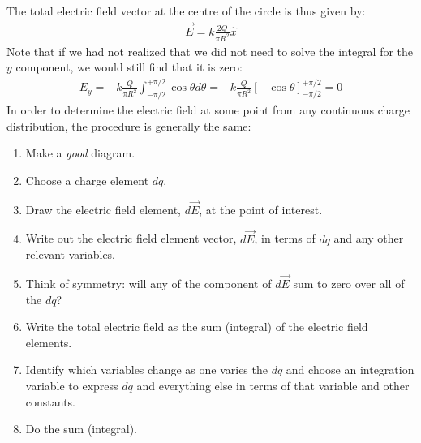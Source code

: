 The total electric field vector at the centre of the circle is thus given by:
\begin{align*}
\vec E = k\frac{2Q}{\pi R^2} \hat x
\end{align*}
Note that if we had not realized that we did not need to solve the integral for the $y$ component, we would still find that it is zero:
\begin{align*}
E_y= -k\frac{Q}{\pi R^2}\int_{-\pi/2}^{+\pi/2}\cos\theta d\theta=-k\frac{Q}{\pi R^2}\left[ -\cos\theta \right]_{-\pi/2}^{+\pi/2}=0
\end{align*}
In order to determine the electric field at some point from any continuous charge distribution, the procedure is generally the same:
\begin{enumerate}
\item Make a \textit{good} diagram.
\item Choose a charge element $dq$.
\item Draw the electric field element, $d\vec E$, at the point of interest.
\item Write out the electric field element vector, $d\vec E$, in terms of $dq$ and any other relevant variables.
\item Think of symmetry: will any of the component of $d\vec E$ sum to zero over all of the $dq$?
\item Write the total electric field as the sum (integral) of the electric field elements.
\item Identify which variables change as one varies the $dq$ and choose an integration variable to express $dq$ and everything else in terms of that variable and other constants.
\item Do the sum (integral).
\end{enumerate}


